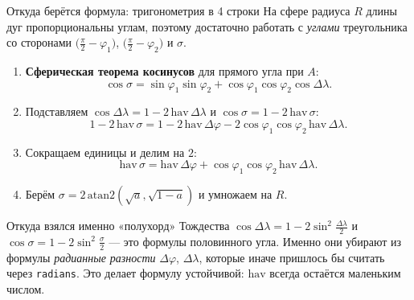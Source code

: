 \documentclass[aspectratio=169,10pt]{beamer}
\begin{document}
\begin{frame}{Откуда берётся формула: тригонометрия в 4 строки}
\footnotesize
На сфере радиуса $R$ длины дуг пропорциональны углам, поэтому достаточно
работать с \emph{углами} треугольника со сторонами
$\bigl(\tfrac{\pi}{2}-\varphi_1\bigr)$,
$\bigl(\tfrac{\pi}{2}-\varphi_2\bigr)$ и $\sigma$.

\begin{enumerate}\itemsep1pt
  \item \textbf{Сферическая теорема косинусов} для прямого угла при $A$:
        \[
          \cos\sigma = \sin\varphi_1\sin\varphi_2
          + \cos\varphi_1\cos\varphi_2\cos\Delta\lambda .
        \]
  \item Подставляем $\cos\Delta\lambda = 1 - 2\,\mathrm{hav}\,\Delta\lambda$
        и $\cos\sigma = 1 - 2\,\mathrm{hav}\,\sigma$:
        \[
          1 - 2\,\mathrm{hav}\,\sigma
          = 1 - 2\,\mathrm{hav}\,\Delta\varphi
            - 2\cos\varphi_1\cos\varphi_2\,\mathrm{hav}\,\Delta\lambda .
        \]
  \item Сокращаем единицы и делим на $2$:
        \[
          \mathrm{hav}\,\sigma = \mathrm{hav}\,\Delta\varphi
          + \cos\varphi_1\cos\varphi_2\,\mathrm{hav}\,\Delta\lambda .
        \]
  \item Берём $\sigma = 2\,\mathrm{atan2}(\sqrt a,\sqrt{1-a})$
        и умножаем на $R$.
\end{enumerate}

\vspace{0.3em}
\begin{block}{Откуда взялся именно «полухорд»}\small
  Тождества $\cos\Delta\lambda = 1-2\sin^2\frac{\Delta\lambda}{2}$ и
  $\cos\sigma = 1-2\sin^2\frac{\sigma}{2}$ --- это формулы половинного
  угла. Именно они убирают из формулы \emph{радианные разности}
  $\Delta\varphi$, $\Delta\lambda$, которые иначе пришлось бы считать
  через \texttt{radians}. Это делает формулу устойчивой: $\mathrm{hav}$
  всегда остаётся маленьким числом.
\end{block}
\end{frame}
\end{document}
